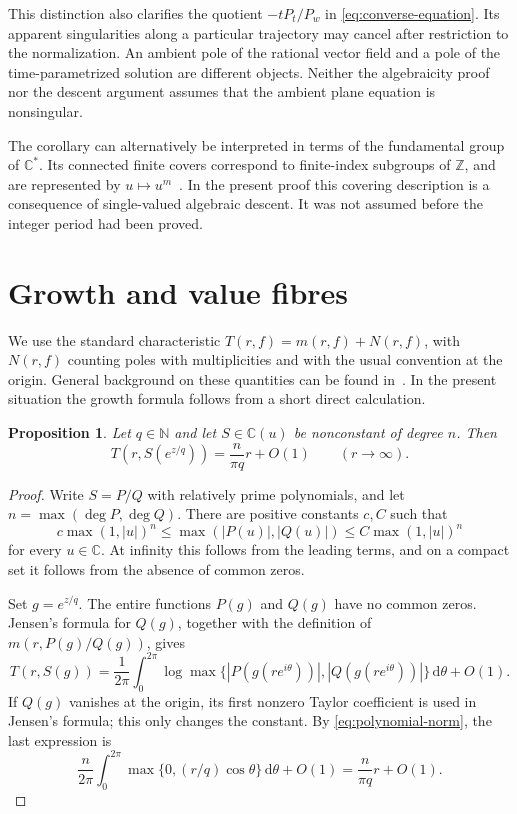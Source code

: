\documentclass[11pt,reqno]{amsart}
\numberwithin{equation}{section}
\newtheorem{proposition}[theorem]{Proposition}
\theoremstyle{definition}
\theoremstyle{remark}
\newcommand{\C}{\mathbb C}
\newcommand{\Z}{\mathbb Z}
\newcommand{\N}{\mathbb N}
\newcommand{\dd}{\,\mathrm d}
\begin{document}
This distinction also clarifies the quotient $-tP_t/P_w$ in
\eqref{eq:converse-equation}. Its apparent singularities along a
particular trajectory may cancel after restriction to the
normalization. An ambient pole of the rational vector field and
a pole of the time-parametrized solution are different objects.
Neither the algebraicity proof nor the descent argument assumes
that the ambient plane equation is nonsingular.

The corollary can alternatively be interpreted in terms of the
fundamental group of $\C^*$. Its connected finite covers correspond
to finite-index subgroups of $\Z$, and are represented by
$u\mapsto u^m$~\cite[Sections~4--5]{Forster1981}. In the present proof
this covering description is a
consequence of single-valued algebraic descent. It was not assumed
before the integer period had been proved.

\section{Growth and value fibres}
\label{sec:growth}

We use the standard characteristic $T(r,f)=m(r,f)+N(r,f)$, with
$N(r,f)$ counting poles with multiplicities and with the usual
convention at the origin. General background on these quantities can
be found in~\cite{Hayman1964,Laine1993}. In the present situation the
growth formula follows from a short direct calculation.

\begin{proposition}
\label{prop:growth}
Let $q\in\N$ and let $S\in\C(u)$ be nonconstant of degree $n$.
Then
\begin{equation}
 T(r,S(e^{z/q}))=\frac{n}{\pi q}r+O(1)
 \qquad(r\to\infty).
 \label{eq:exact-growth}
\end{equation}
\end{proposition}

\begin{proof}
Write $S=P/Q$ with relatively prime polynomials, and let
$n=\max(\deg P,\deg Q)$. There are positive constants $c,C$ such that
\begin{equation}
 c\max(1,|u|)^n
 \leq\max(|P(u)|,|Q(u)|)
 \leq C\max(1,|u|)^n
 \label{eq:polynomial-norm}
\end{equation}
for every $u\in\C$. At infinity this follows from the leading
terms, and on a compact set it follows from the absence of common
zeros.

Set $g=e^{z/q}$. The entire functions $P(g)$ and $Q(g)$ have no
common zeros. Jensen's formula for $Q(g)$, together with the
definition of $m(r,P(g)/Q(g))$, gives
\[
 T(r,S(g))=
 \frac1{2\pi}\int_0^{2\pi}
 \log\max\{|P(g(re^{i\theta}))|,|Q(g(re^{i\theta}))|\}
 \dd\theta+O(1).
\]
If $Q(g)$ vanishes at the origin, its first nonzero Taylor
coefficient is used in Jensen's formula; this only changes the
constant. By \eqref{eq:polynomial-norm}, the last expression is
\[
 \frac{n}{2\pi}\int_0^{2\pi}
 \max\{0,(r/q)\cos\theta\}\dd\theta+O(1)
 =\frac{n}{\pi q}r+O(1).
\]
\end{proof}
\end{document}
